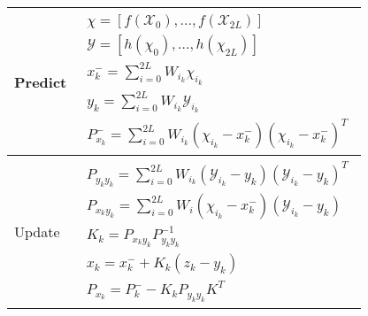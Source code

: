 \begin{center}
	\begin{tabular}{ | m{5em} | m{1cm}| } 
		\hline
		Predict & 
		\begin{align*}
		\chi = [f(\mathcal{X}_0),...,f(\mathcal{X}_{2L})]\\
		\mathcal{Y} = [h(\chi_0),...,h(\chi_{2L})]\\
		x^-_k = \sum_{i=0}^{2L}W_{i_k}\chi_{i_k}\\
		y_k = \sum_{i=0}^{2L}W_{i_k}\mathcal{Y}_{i_k}\\
		P^-_{x_k} = \sum_{i=0}^{2L}W_{i_k}(\chi_{i_k} - x^-_k)(\chi_{i_k} - x^-_k)^T
		\end{align*}\\ 
		\hline
		Update & 
		\begin{align*}
		P_{y_ky_k} = \sum_{i=0}^{2L}W_{i_k}(\mathcal{Y}_{i_k} - y_k)(\mathcal{Y}_{i_k} - y_k)^T \\
		P_{x_ky_k} = \sum_{i=0}^{2L}W_i(\chi_{i_k} - x^-_k)(\mathcal{Y}_{i_k} - y_k)\\
		K_{k} = P_{x_ky_k}P^{-1}_{y_ky_k} \\
		x_{k} = x^-_{k} + K_k(z_k - y_k) \\
		P_{x_k} = P^-_k - K_kP_{y_ky_k}K^T
		\end{align*}\\ 
		\hline
	\end{tabular}
\end{center}



